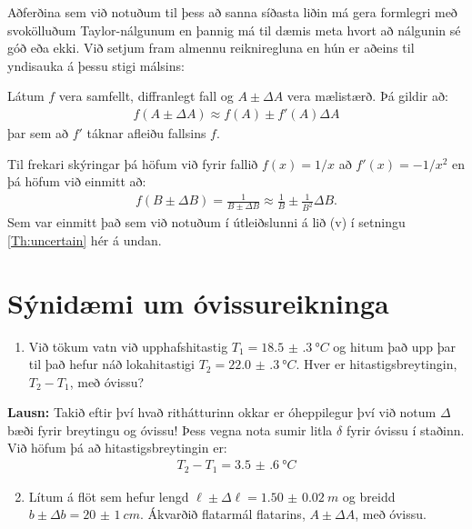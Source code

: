 Aðferðina sem við notuðum til þess að sanna síðasta liðin má gera formlegri með svokölluðum Taylor-nálgunum en þannig má til dæmis meta hvort að nálgunin sé góð eða ekki. Við setjum fram almennu reikniregluna en hún er aðeins til yndisauka á þessu stigi málsins:
\begin{tcolorbox}
\begin{setning}
Látum $f$ vera samfellt, diffranlegt fall og $A \pm \Delta A$ vera mælistærð. Þá gildir að:
\begin{align*}
    f(A \pm \Delta A) \approx f(A) \pm f'(A) \Delta A
\end{align*}
þar sem að $f'$ táknar afleiðu fallsins $f$.
\end{setning}
\end{tcolorbox}

Til frekari skýringar þá höfum við fyrir fallið $f(x) = 1/x$ að $f'(x) = - 1/x^2$ en þá höfum við einmitt að:
\begin{align*}
    f(B \pm \Delta B) = \frac{1}{B \pm \Delta B} \approx \frac{1}{B} \pm \frac{1}{B^2} \Delta B.
\end{align*}
Sem var einmitt það sem við notuðum í útleiðslunni á lið (v) í setningu \ref{Th:uncertain} hér á undan.

\newpage

\section{Sýnidæmi um óvissureikninga}


\begin{enumerate}[label = \textbf{Sýnidæmi \thechapter.\arabic*.}]

\item Við tökum vatn við upphafshitastig $T_1 = \SI{18.5(3)}{\degree C}$ og hitum það upp þar til það hefur náð lokahitastigi $T_2 = \SI{22.0(3)}{\degree C}$. Hver er hitastigsbreytingin, $T_2 - T_1$, með óvissu? 
\end{enumerate}

\textbf{Lausn:} Takið eftir því hvað rithátturinn okkar er óheppilegur því við notum $\Delta$ bæði fyrir breytingu og óvissu! Þess vegna nota sumir litla $\delta$ fyrir óvissu í staðinn. Við höfum þá að hitastigsbreytingin er:
\begin{align*}
    T_2 - T_1 = \SI{3.5(6)}{\degree C} 
\end{align*}

\begin{enumerate}[label = \textbf{Sýnidæmi \thechapter.\arabic*.}]

\setcounter{enumi}{1}

\item Lítum á flöt sem hefur lengd $\ell \pm \Delta \ell = \SI{1.50(2)}{m}$ og breidd $b \pm \Delta b = \SI{20(1)}{cm}$. Ákvarðið flatarmál flatarins, $A \pm \Delta A$, með óvissu.

\end{enumerate}

